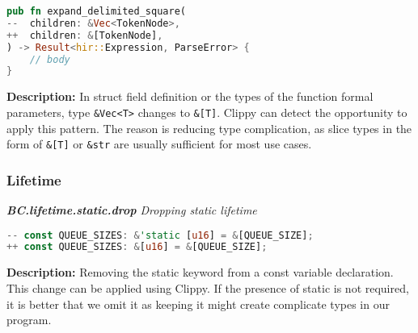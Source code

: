 \begin{lstlisting}[language=Rust, style=colouredRust]
pub fn expand_delimited_square(
--  children: &Vec<TokenNode>,
++  children: &[TokenNode],
) -> Result<hir::Expression, ParseError> {
    // body
}
\end{lstlisting}
\noindent \textbf{Description:} In struct field definition or the types of the function formal parameters, type \verb+&Vec<T>+ changes to \verb+&[T]+. Clippy can detect the opportunity to apply this pattern. The reason is reducing type complication, as slice types in the form of \verb+&[T]+ or \verb+&str+ are usually sufficient for most use cases. 

\subsubsection{Lifetime}
\noindent \textit{ \textbf{BC.lifetime.static.drop} Dropping static lifetime}

\begin{lstlisting}[language=Rust, style=colouredRust]
-- const QUEUE_SIZES: &'static [u16] = &[QUEUE_SIZE];
++ const QUEUE_SIZES: &[u16] = &[QUEUE_SIZE];

\end{lstlisting}

\noindent \textbf{Description:} Removing the static keyword from a const variable declaration. This change can be applied using Clippy. If the presence of static is not required, it is better that we omit it as keeping it might create complicate types in our program.

